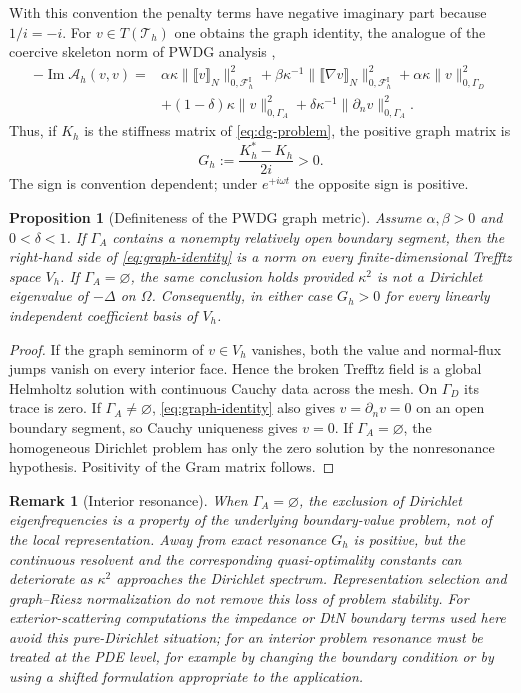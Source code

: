 \documentclass[11pt]{article}
\newtheorem{proposition}[theorem]{Proposition}
\newtheorem{remark}[theorem]{Remark}
\newcommand{\ii}{i}
\newcommand{\Th}{\mathcal{T}_h}
\newcommand{\FhI}{\mathcal{F}_h^{\mathrm I}}
\newcommand{\jump}[1]{\llbracket #1\rrbracket}
\renewcommand{\Im}{\operatorname{Im}}
\numberwithin{equation}{section}
\begin{document}
With this convention the penalty terms have negative imaginary part because $1/\ii=-\ii$.  For $v\in T(\Th)$ one obtains the graph identity, the analogue of the coercive skeleton norm of PWDG analysis \citep{GittelsonHiptmairPerugia2009,HiptmairMoiolaPerugia2011},
\begin{align}\label{eq:graph-identity}
 -\Im\mathscr A_h(v,v)
={}&\alpha\kappa\|\jump v_N\|_{0,\FhI}^2
 +\beta\kappa^{-1}\|\jump{\nabla v}_N\|_{0,\FhI}^2
 +\alpha\kappa\|v\|_{0,\Gamma_D}^2\nonumber\\
 &+(1-\delta)\kappa\|v\|_{0,\Gamma_A}^2
 +\delta\kappa^{-1}\|\partial_nv\|_{0,\Gamma_A}^2.
\end{align}
Thus, if $K_h$ is the stiffness matrix of \eqref{eq:dg-problem}, the positive graph matrix is
\begin{equation}\label{eq:G-correct-sign}
 G_h:=\frac{K_h^*-K_h}{2\ii}>0.
\end{equation}
The sign is convention dependent; under $e^{+\ii\omega t}$ the opposite sign is positive.

\begin{proposition}[Definiteness of the PWDG graph metric]\label{prop:graph-definite}
Assume $\alpha,\beta>0$ and $0<\delta<1$.  If $\Gamma_A$ contains a nonempty relatively open boundary segment, then the right-hand side of \eqref{eq:graph-identity} is a norm on every finite-dimensional Trefftz space $V_h$.  If $\Gamma_A=\varnothing$, the same conclusion holds provided $\kappa^2$ is not a Dirichlet eigenvalue of $-\Delta$ on $\Omega$.  Consequently, in either case $G_h>0$ for every linearly independent coefficient basis of $V_h$.
\end{proposition}
\begin{proof}
If the graph seminorm of $v\in V_h$ vanishes, both the value and normal-flux jumps vanish on every interior face.  Hence the broken Trefftz field is a global Helmholtz solution with continuous Cauchy data across the mesh.  On $\Gamma_D$ its trace is zero.  If $\Gamma_A\ne\varnothing$, \eqref{eq:graph-identity} also gives $v=\partial_n v=0$ on an open boundary segment, so Cauchy uniqueness gives $v=0$.  If $\Gamma_A=\varnothing$, the homogeneous Dirichlet problem has only the zero solution by the nonresonance hypothesis.  Positivity of the Gram matrix follows.
\end{proof}

\begin{remark}[Interior resonance]\label{rem:resonance}
When $\Gamma_A=\varnothing$, the exclusion of Dirichlet eigenfrequencies is a property of the underlying boundary-value problem, not of the local representation.  Away from exact resonance $G_h$ is positive, but the continuous resolvent and the corresponding quasi-optimality constants can deteriorate as $\kappa^2$ approaches the Dirichlet spectrum.  Representation selection and graph--Riesz normalization do not remove this loss of problem stability.  For exterior-scattering computations the impedance or DtN boundary terms used here avoid this pure-Dirichlet situation; for an interior problem resonance must be treated at the PDE level, for example by changing the boundary condition or by using a shifted formulation appropriate to the application.
\end{remark}
\end{document}
